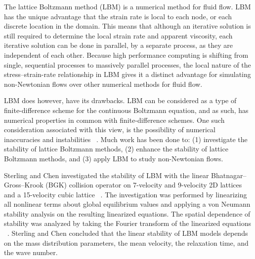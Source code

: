 \documentclass{article}
\begin{document}
The lattice Boltzmann method (LBM) is a numerical method for fluid flow.
LBM has the unique advantage that the strain rate is local to each node, or each discrete location in the domain.
This means that although an iterative solution is still required to determine the local strain rate and apparent viscosity, each iterative solution can be done in parallel, by a separate process, as they are independent of each other.
Because high performance computing is shifting from single, sequential processes to massively parallel processes, the local nature of the stress--strain-rate relationship in LBM gives it a distinct advantage for simulating non-Newtonian flows over other numerical methods for fluid flow. %

LBM does however, have its drawbacks.
LBM can be considered as a type of finite-difference scheme for the continuous Boltzmann equation, and as such, has numerical properties in common with finite-difference schemes. %
One such consideration associated with this view, is the possibility of numerical inaccuracies and instabilities ~\cite{sterling1993stability,sterling1996stability,bawazeer2013stability,lallemand2000theory}. %
Much work has been done to: (1) investigate the stability of lattice Boltzmann methods, (2) enhance the stability of lattice Boltzmann methods, and (3) apply LBM to study non-Newtonian flows.

Sterling and Chen investigated the stability of LBM with the linear Bhatnagar--Gross--Krook (BGK) collision operator on 7-velocity and 9-velocity 2D lattices and a 15-velocity cubic lattice ~\cite{sterling1993stability,sterling1996stability}.
The investigation was performed by linearizing all nonlinear terms about global equilibrium values and applying a von Neumann stability analysis on the resulting linearized equations.
The spatial dependence of stability was analyzed by taking the Fourier transform of the linearized equations ~\cite{sterling1993stability}.
Sterling and Chen concluded that the linear stability of LBM models depends on the mass distribution parameters, the mean velocity, the relaxation time, and the wave number. %
\end{document}
